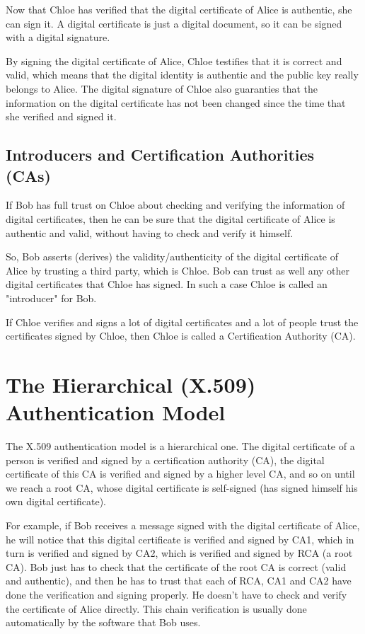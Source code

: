 \documentclass[a4paper]{article}
\begin{document}
Now that Chloe has verified that the digital certificate of Alice is
authentic, she can sign it. A digital certificate is just a digital
document, so it can be signed with a digital signature.

By signing the digital certificate of Alice, Chloe testifies that it
is correct and valid, which means that the digital identity is
authentic and the public key really belongs to Alice. The digital
signature of Chloe also guaranties that the information on the digital
certificate has not been changed since the time that she verified and
signed it.

\subsection{Introducers and Certification Authorities (CAs)}

If Bob has full trust on Chloe about checking and verifying the
information of digital certificates, then he can be sure that the
digital certificate of Alice is authentic and valid, without having to
check and verify it himself.

So, Bob asserts (derives) the validity/authenticity of the digital
certificate of Alice by trusting a third party, which is Chloe. Bob
can trust as well any other digital certificates that Chloe has
signed.  In such a case Chloe is called an "introducer" for Bob.

If Chloe verifies and signs a lot of digital certificates and a lot of
people trust the certificates signed by Chloe, then Chloe is called a
Certification Authority (CA).


\section{The Hierarchical (X.509) Authentication Model}

The X.509 authentication model is a hierarchical one. The digital
certificate of a person is verified and signed by a certification
authority (CA), the digital certificate of this CA is verified and
signed by a higher level CA, and so on until we reach a root CA, whose
digital certificate is self-signed (has signed himself his own digital
certificate).

For example, if Bob receives a message signed with the digital
certificate of Alice, he will notice that this digital certificate is
verified and signed by CA1, which in turn is verified and signed by
CA2, which is verified and signed by RCA (a root CA). Bob just has to
check that the certificate of the root CA is correct (valid and
authentic), and then he has to trust that each of RCA, CA1 and CA2
have done the verification and signing properly. He doesn't have to
check and verify the certificate of Alice directly. This chain
verification is usually done automatically by the software that Bob
uses.
\end{document}
